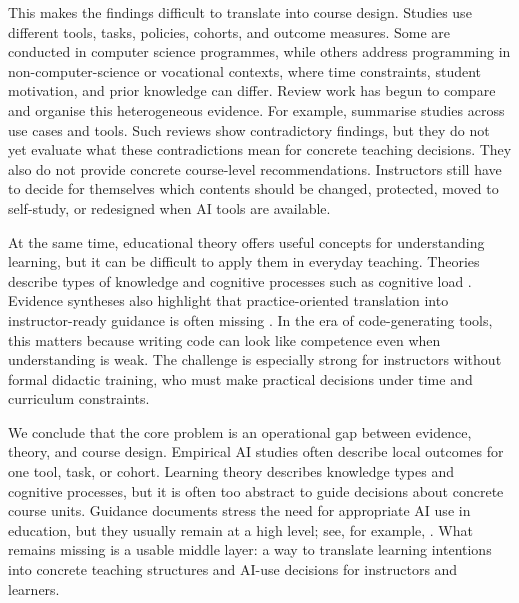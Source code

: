 \documentclass{article}
\begin{document}
This makes the findings difficult to translate into course design. Studies use different tools, tasks, policies, cohorts, and outcome measures. Some are conducted in computer science programmes, while others address programming in non-computer-science or vocational contexts, where time constraints, student motivation, and prior knowledge can differ. 
Review work has begun to compare and organise this heterogeneous evidence. For example, \citet{RaihanEtAl2025LLMCSeduSLR} summarise studies across use cases and tools. Such reviews show contradictory findings, but they do not yet evaluate what these contradictions mean for concrete teaching decisions. They also do not provide concrete course-level recommendations. Instructors still have to decide for themselves which contents should be changed, protected, moved to self-study, or redesigned when AI tools are available.\par

At the same time, educational theory offers useful concepts for understanding learning, but it can be difficult to apply them in everyday teaching. Theories describe types of knowledge \citep{Krathwohl2002} and cognitive processes such as cognitive load \citep{SwellerAyresKalyuga2011CognitiveLoadTheory}. Evidence syntheses also highlight that practice-oriented translation into instructor-ready guidance is often missing \citep{ZawackiRichterEtAl2019Educators}. In the era of code-generating tools, this matters because writing code can look like competence even when understanding is weak. The challenge is especially strong for instructors without formal didactic training, who must make practical decisions under time and curriculum constraints.\par

We conclude that the core problem is an operational gap between evidence, theory, and course design. Empirical AI studies often describe local outcomes for one tool, task, or cohort. Learning theory describes knowledge types and cognitive processes, but it is often too abstract to guide decisions about concrete course units. Guidance documents stress the need for appropriate AI use in education, but they usually remain at a high level; see, for example, \citep{UNESCO2023GenAI}. What remains missing is a usable middle layer: a way to translate learning intentions into concrete teaching structures and AI-use decisions for instructors and learners.\par
\end{document}

